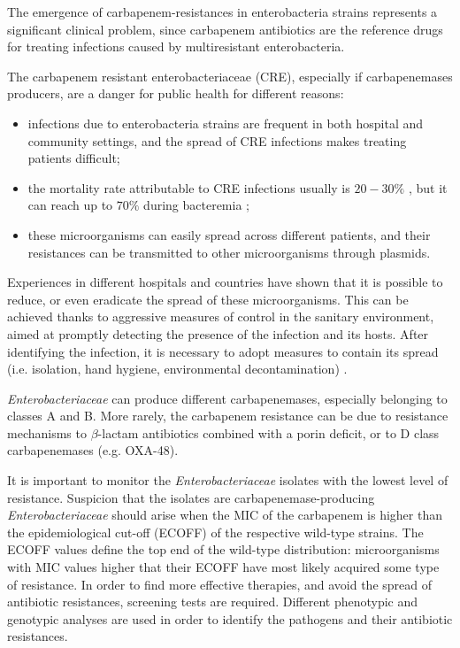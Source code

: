 \documentclass[11pt]{report}
\begin{document}
The emergence of carbapenem-resistances in enterobacteria strains represents a significant clinical problem, since carbapenem antibiotics are the reference drugs for treating infections caused by multiresistant enterobacteria.

The carbapenem resistant enterobacteriaceae (CRE), especially if carbapenemases producers, are a danger for public health for different reasons:
\begin{itemize}
\item infections due to enterobacteria strains are frequent in both hospital and community settings, and the spread of CRE infections makes treating patients difficult;
\item the mortality rate attributable to CRE infections usually is $20-30\%$ \cite{carmeli2010controlling}, but it can reach up to $70\%$ during bacteremia \cite{mouloudi2010bloodstream};
\item these microorganisms can easily spread across different patients, and their resistances can be transmitted to other microorganisms through plasmids.
\end{itemize}

Experiences in different hospitals and countries have shown that it is possible to reduce, or even eradicate the spread of these microorganisms.
This can be achieved thanks to aggressive measures of control in the sanitary environment, aimed at promptly detecting the presence of the infection and its hosts.
After identifying the infection, it is necessary to adopt measures to contain its spread (i.e. isolation, hand hygiene, environmental decontamination) \cite{gupta2011carbapenem}.

\emph{Enterobacteriaceae} can produce different carbapenemases, especially belonging to classes A and B.
More rarely, the carbapenem resistance can be due to resistance mechanisms to $\beta$-lactam antibiotics combined with a porin deficit, or to D class carbapenemases (e.g. OXA-48).

It is important to monitor the \emph{Enterobacteriaceae} isolates with the lowest level of resistance.
Suspicion that the isolates are carbapenemase-producing \emph{Enterobacteriaceae} should arise when the MIC of the carbapenem is higher than the epidemiological cut-off (ECOFF) of the respective wild-type strains.
The ECOFF values define the top end of the wild-type distribution: microorganisms with MIC values higher that their ECOFF have most likely acquired some type of resistance.
In order to find more effective therapies, and avoid the spread of antibiotic resistances, screening tests are required.
Different phenotypic and genotypic analyses are used in order to identify the pathogens and their antibiotic resistances.
\end{document}
